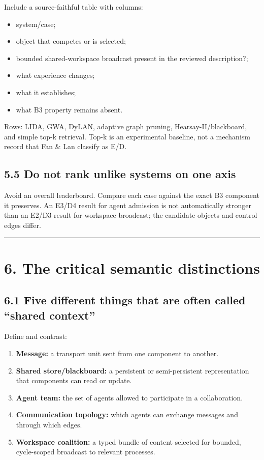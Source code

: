 Include a source-faithful table with columns:

\begin{itemize}
\tightlist
\item
  system/case;
\item
  object that competes or is selected;
\item
  bounded shared-workspace broadcast present in the reviewed description?;
\item
  what experience changes;
\item
  what it establishes;
\item
  what B3 property remains absent.
\end{itemize}

Rows: LIDA, GWA, DyLAN, adaptive graph pruning, Hearsay-II/blackboard, and simple top-k retrieval. Top-k is an experimental baseline, not a mechanism record that Fan \& Lan classify as E/D.

\subsection{5.5 Do not rank unlike systems on one axis}\label{55-do-not-rank-unlike-systems-on-one-axis}

Avoid an overall leaderboard. Compare each case against the exact B3 component it preserves. An E3/D4 result for agent admission is not automatically stronger than an E2/D3 result for workspace broadcast; the candidate objects and control edges differ.

\begin{center}\rule{0.5\linewidth}{0.5pt}\end{center}

\section{6. The critical semantic distinctions}\label{6-the-critical-semantic-distinctions}

\subsection{6.1 Five different things that are often called ``shared context''}\label{61-five-different-things-that-are-often-called-shared-context}

Define and contrast:

\begin{enumerate}
\def\labelenumi{\arabic{enumi}.}
\tightlist
\item
  \textbf{Message:} a transport unit sent from one component to another.
\item
  \textbf{Shared store/blackboard:} a persistent or semi-persistent representation that components can read or update.
\item
  \textbf{Agent team:} the set of agents allowed to participate in a collaboration.
\item
  \textbf{Communication topology:} which agents can exchange messages and through which edges.
\item
  \textbf{Workspace coalition:} a typed bundle of content selected for bounded, cycle-scoped broadcast to relevant processes.
\end{enumerate}


